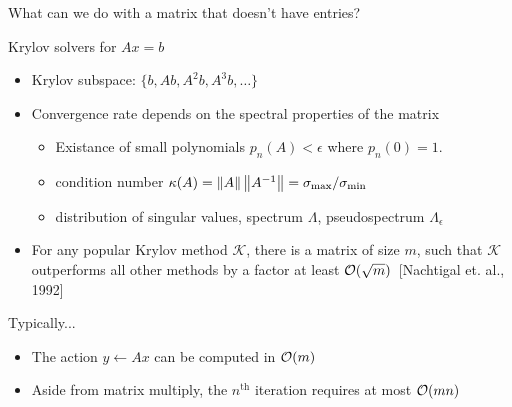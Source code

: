 \begin{frame}{What can we do with a matrix that doesn't have entries?}
  \begin{block}{Krylov solvers for $A x = b$}
    \begin{itemize}
    \item Krylov subspace: $\{b, Ab, A^2b, A^3b, \dotsc\}$
    \item Convergence rate depends on the spectral properties of the matrix
      \begin{itemize}
      \item Existance of small polynomials $p_n(A) < \epsilon$ where $p_n(0) = 1$.
      \item condition number $\kappa(A) = \left\lVert A \right\rVert \left\lVert A^{-1} \right\rVert = \sigma_{\text{max}}/\sigma_{\text{min}}$
      \item distribution of singular values, spectrum $\Lambda$, pseudospectrum $\Lambda_\epsilon$
      \end{itemize}
    \item For any popular Krylov method $\mathcal{K}$, there is a matrix
      of size $m$, such that $\mathcal{K}$ outperforms all other methods
      by a factor at least $\mathcal{O}(\sqrt{m})$~[Nachtigal et. al., 1992]%
    \end{itemize}
  \end{block}
  \begin{block}{Typically...}
    \begin{itemize}
    \item The action $y \gets A x$ can be computed in $\mathcal{O}(m)$
    \item Aside from matrix multiply, the $n^{\text{th}}$ iteration requires at most $\mathcal{O}(mn)$
    \end{itemize}
  \end{block}
\end{frame}
